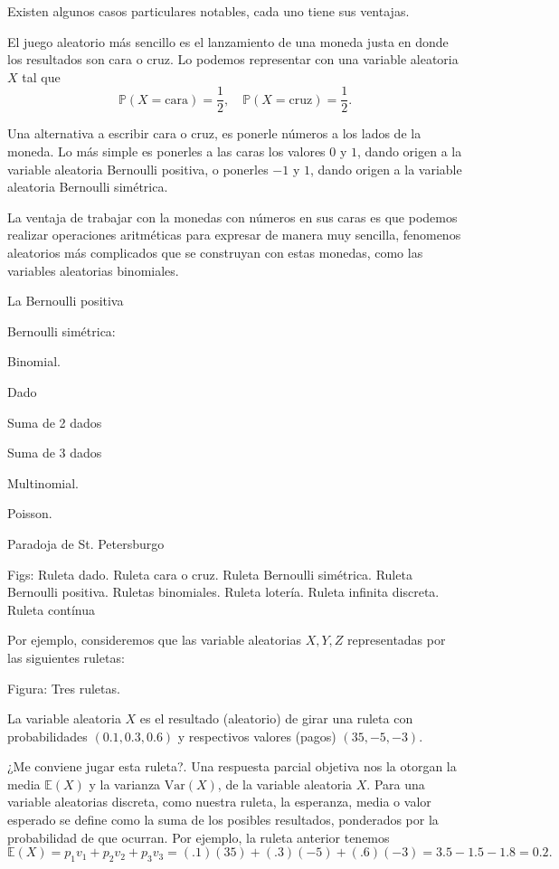 Existen algunos casos particulares notables, cada uno tiene sus ventajas.

El juego aleatorio más sencillo es el lanzamiento de una moneda justa en donde los resultados son cara o cruz. Lo podemos representar con una variable aleatoria $X$ tal que
$$\mathbb P (X=\text{cara})=\frac{1}{2},\quad \mathbb P (X=\text{cruz})=\frac{1}{2}.$$

Una alternativa a escribir cara o cruz, es ponerle números a los lados de la moneda. Lo más simple es ponerles a las caras los valores $0$ y $1$, dando origen a la variable aleatoria Bernoulli positiva, o ponerles $-1$ y $1$, dando origen a la variable aleatoria Bernoulli simétrica.

La ventaja de trabajar con la monedas con números en sus caras es que podemos realizar operaciones aritméticas para expresar de manera muy sencilla, fenomenos aleatorios más complicados que se construyan con estas monedas, como las variables aleatorias binomiales.

La Bernoulli positiva

Bernoulli simétrica:

Binomial.

Dado

Suma de 2 dados

Suma de 3 dados

Multinomial.

Poisson.

Paradoja de St. Petersburgo


Figs: Ruleta dado. Ruleta cara o cruz.  Ruleta Bernoulli simétrica. Ruleta Bernoulli positiva. Ruletas binomiales. Ruleta lotería. Ruleta infinita discreta. Ruleta contínua \vspace{4cm}









Por ejemplo, consideremos que las variable aleatorias $X, Y, Z$ representadas por las siguientes ruletas: 

Figura: Tres ruletas.

La variable aleatoria $X$ es el resultado (aleatorio) de girar una ruleta con probabilidades $(0.1, 0.3, 0.6)$ y respectivos valores (pagos) $(35, -5, -3)$.

¿Me conviene jugar esta ruleta?. Una respuesta parcial objetiva nos la otorgan la media $\mathbb E (X)$ y la varianza $\mathrm{Var}(X)$, de la variable aleatoria $X$. Para una variable aleatorias discreta, como nuestra ruleta, la esperanza, media o valor esperado se define como la suma de los posibles resultados, ponderados por la probabilidad de que ocurran. Por ejemplo, la ruleta anterior tenemos 
$$\mathbb E (X)=p_1v_1+p_2v_2+p_3v_3=(.1)(35)+(.3)(-5)+(.6)(-3)=3.5-1.5-1.8=0.2.$$

